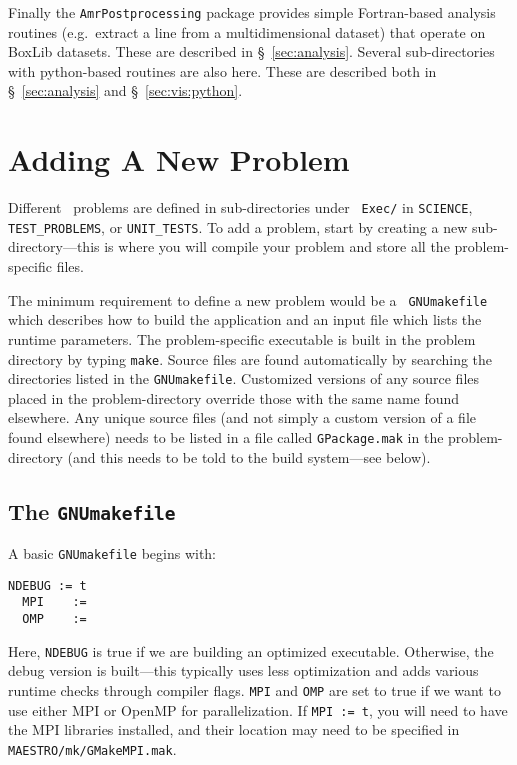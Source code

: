 Finally the {\tt AmrPostprocessing} package provides simple
Fortran-based analysis routines (e.g.\ extract a line from a
multidimensional dataset) that operate on BoxLib datasets.  These are
described in \S~\ref{sec:analysis}.  Several sub-directories with
python-based routines are also here.  These are described both in
\S~\ref{sec:analysis} and \S~\ref{sec:vis:python}.





\section{Adding A New Problem}
\label{sec:adding_problems}

Different \maestro\ problems are defined in sub-directories under {\tt
  Exec/} in {\tt SCIENCE}, {\tt TEST\_PROBLEMS}, or {\tt UNIT\_TESTS}.
To add a problem, start by creating a new sub-directory---this is
where you will compile your problem and store all the problem-specific
files.

The minimum requirement to define a new problem would be a {\tt
  GNUmakefile} which describes how to build the application and an
input file which lists the runtime parameters.  The problem-specific
executable is built in the problem directory by typing {\tt make}.
Source files are found automatically by searching the directories
listed in the {\tt GNUmakefile}.  Customized versions of any source
files placed in the problem-directory override those with the same
name found elsewhere.  Any unique source files (and not simply a
custom version of a file found elsewhere) needs to be listed in a file
called {\tt GPackage.mak} in the problem-directory (and this needs to
be told to the build system---see below).

\subsection{The {\tt GNUmakefile}}

\label{sec:makefile}

A basic {\tt GNUmakefile} begins with:
\begin{lstlisting}[language={[gnu]make},mathescape=false]
  NDEBUG := t
  MPI    :=
  OMP    :=
\end{lstlisting}
Here, {\tt NDEBUG} is true if we are building an optimized executable.
Otherwise, the debug version is built---this typically uses less
optimization and adds various runtime checks through compiler flags.
{\tt MPI} and {\tt OMP} are set to true if we want to use either MPI
or OpenMP for parallelization.  If {\tt MPI := t}, you will need to
have the MPI libraries installed, and their location may need to be 
specified in {\tt MAESTRO/mk/GMakeMPI.mak}.

